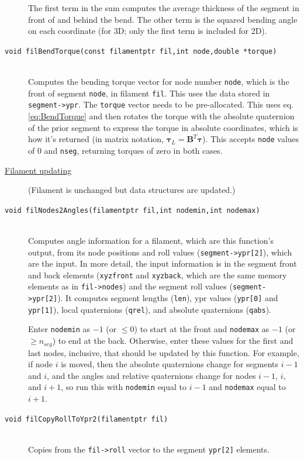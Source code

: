 \documentclass {scrbook}
\newcommand {\ttt} {\texttt}
\begin{document}
\begin{description}
The first term in the sum computes the average thickness of the segment in front of and behind the bend. The other term is the squared bending angle on each coordinate (for 3D; only the first term is included for 2D).

\item[\ttt{void filBendTorque(const filamentptr fil,int node,double *torque)}]
\hfill \\
Computes the bending torque vector for node number \ttt{node}, which is the front of segment \ttt{node}, in filament \ttt{fil}. This uses the data stored in \ttt{segment->ypr}. The \ttt{torque} vector needs to be pre-allocated. This uses eq. \ref{eq:BendTorque} and then rotates the torque with the absolute quaternion of the prior segment to express the torque in absolute coordinates, which is how it's returned (in matrix notation, $\bm{\tau}_L = \bm{B}^T\bm{\tau}$). This accepts \ttt{node} values of 0 and \ttt{nseg}, returning torques of zero in both cases.


\item[\underline{Filament updating}]
(Filament is unchanged but data structures are updated.)

\item[\ttt{void filNodes2Angles(filamentptr fil,int nodemin,int nodemax)}]
\hfill \\
Computes angle information for a filament, which are this function's output, from its node positions and roll values (\ttt{segment->ypr[2]}), which are the input. In more detail, the input information is in the segment front and back elements (\ttt{xyzfront} and \ttt{xyzback}, which are the same memory elements as in \ttt{fil->nodes}) and the segment roll values (\ttt{segment->ypr[2]}). It computes segment lengths (\ttt{len}), ypr values (\ttt{ypr[0]} and \ttt{ypr[1]}), local quaternions (\ttt{qrel}), and absolute quaternions (\ttt{qabs}).

Enter \ttt{nodemin} as $-1$ (or $\leq 0$) to start at the front and \ttt{nodemax} as $-1$ (or $\geq n_{seg}$) to end at the back. Otherwise, enter these values for the first and last nodes, inclusive, that should be updated by this function. For example, if node $i$ is moved, then the absolute quaternions change for segments $i-1$ and $i$, and the angles and relative quaternions change for nodes $i-1$, $i$, and $i+1$, so run this with \ttt{nodemin} equal to $i-1$ and \ttt{nodemax} equal to $i+1$.

\item[\ttt{void filCopyRollToYpr2(filamentptr fil)}]
\hfill \\
Copies from the \ttt{fil->roll} vector to the segment \ttt{ypr[2]} elements.


\end{description}
\end{document}
